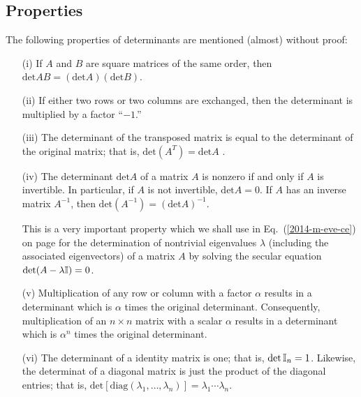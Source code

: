 \subsection{Properties}

The following properties of determinants are mentioned (almost) without proof:

\begin{itemize}
\item[(i)]
If $A$ and $B$ are square matrices of the same order, then
$\textrm{det}AB = (\textrm{det}A)  (\textrm{det}B)$.

\item[(ii)]
If either two rows or two columns are exchanged, then the determinant is multiplied
by a factor ``$-1$.''


\item[(iii)]
The determinant of the transposed matrix is equal to the determinant of the original matrix; that is,
$\textrm{det}(A^T) = \textrm{det}A $ .

\item[(iv)]
The determinant $\textrm{det}A $ of a matrix $A$ is nonzero if and only if $A$ is invertible.
In particular, if $A$ is not invertible, $\textrm{det}A =0$.
If $A$ has an inverse matrix $A^{-1}$, then $\textrm{det}(A^{-1}) = (\textrm{det}A)^{-1} $.

This is a very important property which we shall use in Eq.~(\ref{2014-m-eve-ce}) on page \pageref{2014-m-eve-ce}
for the determination of nontrivial
eigenvalues $\lambda$ (including the associated eigenvectors)
of a matrix $A$ by solving the secular equation $\textrm{det} (A-\lambda {\Bbb I})=0 $.



\item[(v)]
Multiplication of any row or column with a factor $\alpha$  results in a determinant
which is $\alpha$ times the original determinant.
Consequently,
multiplication of an $n \times n$ matrix with a scalar $\alpha$ results
in a   determinant
which is $\alpha^n$ times the original determinant.

\item[(vi)]
The determinant of a identity matrix is one; that is,
$\textrm{det} \, {\Bbb I}_n =1$.
Likewise, the determinat of a diagonal matrix is just the product of the diagonal entries;
that is,
$\textrm{det} [\textrm{diag}(\lambda_1,\ldots, \lambda_n)] = \lambda_1 \cdots \lambda_n$.


\end{itemize}
